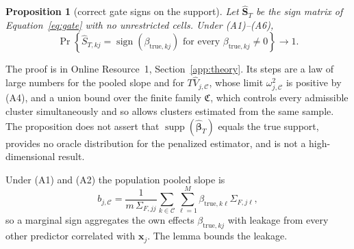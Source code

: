 \documentclass[lineno,pdflatex,sn-basic]{sn-jnl}
\theoremstyle{thmstyleone}
\newtheorem{proposition}{Proposition}
\begin{document}
\begin{proposition}[correct gate signs on the support]\label{prop:gate}
Let $\widehat{\bm S}_T$ be the sign matrix of Equation~\eqref{eq:gate} with no
unrestricted cells. Under (A1)--(A6),
\begin{equation}\label{eq:gate-main-result}
	\Pr\!\left\{\widehat S_{T,kj}
	=\operatorname{sign}(\beta_{\mathrm{true},kj})
	\text{ for every }\beta_{\mathrm{true},kj}\ne0\right\}\longrightarrow1 .
\end{equation}
\end{proposition}
The proof is in Online Resource~1, Section~\ref{app:theory}. Its steps are a
law of large numbers for the pooled slope and for $T\widehat V_{j,\mathcal C}$,
whose limit $\omega_{j,\mathcal C}^2$ is positive by (A4), and a union bound
over the finite family $\mathfrak C$, which controls every admissible cluster
simultaneously and so allows clusters estimated from the same sample. The
proposition does not assert that $\operatorname{supp}(\widehat{\bm\beta}_T)$
equals the true support, provides no oracle distribution for the penalized
estimator, and is not a high-dimensional result.

Under (A1) and (A2) the population pooled slope is
\begin{equation}\label{eq:marginal-leakage-main}
 b_{j,\mathcal C}
 =\frac{1}{m\,\Sigma_{F,jj}}
 \sum_{k\in\mathcal C}\sum_{\ell=1}^M
 \beta_{\mathrm{true},k\ell}\Sigma_{F,j\ell},
\end{equation}
so a marginal sign aggregates the own effects $\beta_{\mathrm{true},kj}$ with
leakage from every other predictor correlated with $\bm x_j$. The lemma bounds
the leakage.
\end{document}
